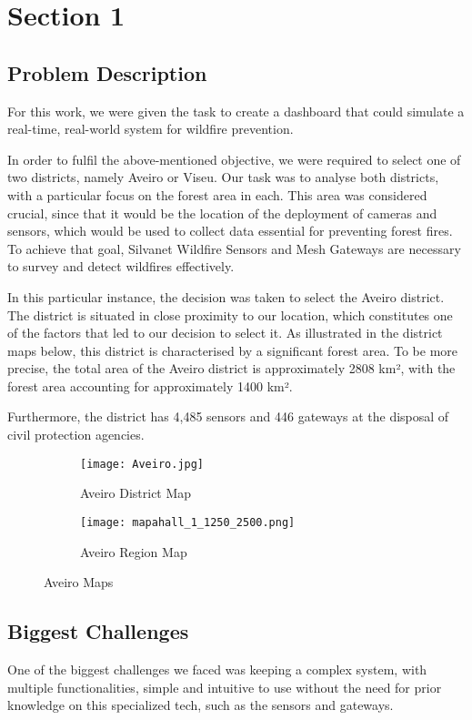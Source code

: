 \chapter*{Section 1} \label{section1}
\section{Problem Description}
For this work, we were given the task to create a dashboard 
that could simulate a real-time, real-world system for wildfire 
prevention. \par
In order to fulfil the above-mentioned objective, 
we were required to select one of two districts, 
namely Aveiro or Viseu. Our task was to analyse both districts, 
with a particular focus on the forest area in each. 
This area was considered crucial, since that it would be 
the location of the deployment of cameras and sensors, 
which would be used to collect data essential for preventing forest fires. 
To achieve
that goal, Silvanet Wildfire Sensors and Mesh Gateways are necessary to
survey and detect wildfires effectively. \par
In this particular instance, the decision was taken to select the Aveiro district. The district is situated in close proximity to our location, which constitutes one of the factors that led to our decision to select it. As illustrated in the district maps below, this district is characterised by a significant forest area. To be more precise, the total area of the Aveiro district is approximately 2808 km², with the forest area accounting for approximately 1400 km². \par
Furthermore, the district has 4,485 sensors and 446 gateways at the disposal of civil protection agencies. \par
\begin{figure}[H]
    \centering
    \begin{subfigure}[b]{0.5\textwidth}
        \centering 
        \texttt{[image: Aveiro.jpg]}
        \caption{Aveiro District Map}
    \end{subfigure}%
    \begin{subfigure}[b]{0.5\textwidth}
        \centering 
        \texttt{[image: mapahall\_1\_1250\_2500.png]}
        \caption{Aveiro Region Map}
    \end{subfigure}
    \caption{Aveiro Maps}
\end{figure}
\section{Biggest Challenges}
One of the biggest challenges we faced was keeping a complex system, with multiple functionalities, simple
and intuitive to use without the need for prior knowledge on this
specialized tech, such as the sensors and gateways. 

